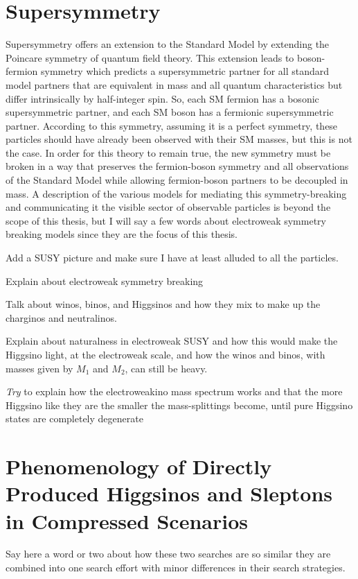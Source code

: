 \section{Supersymmetry}
\label{sec:susy}
Supersymmetry offers an extension to the Standard Model by extending the Poincare symmetry of quantum field theory.  This extension leads to boson-fermion symmetry which predicts a supersymmetric partner for all standard model partners that are equivalent in mass and all quantum characteristics but differ intrinsically by half-integer spin.  So, each SM fermion has a bosonic supersymmetric partner, and each SM boson has a fermionic supersymmetric partner.  According to this symmetry, assuming it is a perfect symmetry, these particles should have already been observed with their SM masses, but this is not the case.  In order for this theory to remain true, the new symmetry must be broken in a way that preserves the fermion-boson symmetry and all observations of the Standard Model while allowing fermion-boson partners to be decoupled in mass.  A description of the various models for mediating this symmetry-breaking and communicating it the visible sector of observable particles is beyond the scope of this thesis, but I will say a few words about electroweak symmetry breaking models since they are the focus of this thesis.

Add a SUSY picture and make sure I have at least alluded to all the particles.

Explain about electroweak symmetry breaking

Talk about winos, binos, and Higgsinos and how they mix to make up the charginos and neutralinos.

Explain about naturalness in electroweak SUSY and how this would make the Higgsino light, at the electroweak scale, and how the winos and binos, with masses given by $M_1$ and $M_2$, can still be heavy.

\textit{Try} to explain how the electroweakino mass spectrum works and that the more Higgsino like they are the smaller the mass-splittings become, until pure Higgsino states are completely degenerate

\section{Phenomenology of Directly Produced Higgsinos and Sleptons in Compressed Scenarios}
\label{sec:pheno}
Say here a word or two about how these two searches are so similar they are combined into one search effort with minor differences in their search strategies.

